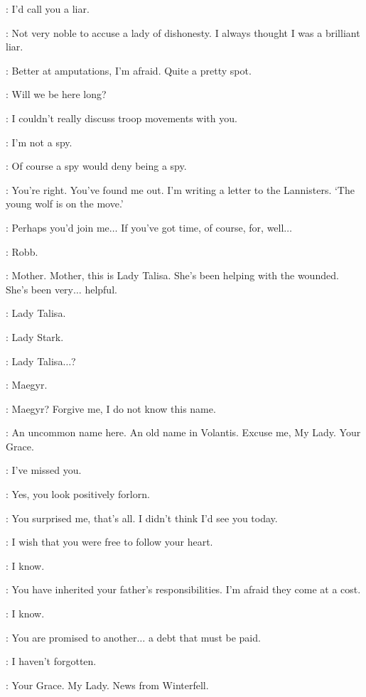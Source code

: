 \ROBB: I'd call you a liar. 

\TALISA: Not very noble to accuse a lady of dishonesty. I always thought I was a brilliant liar. 

\ROBB: Better at amputations, I'm afraid. Quite a pretty spot. 

\TALISA: Will we be here long? 

\ROBB: I couldn't really discuss troop movements with you. 

\TALISA: I'm not a spy. 

\ROBB: Of course a spy would deny being a spy. 

\TALISA: You're right. You've found me out. I'm writing a letter to the Lannisters. `The young wolf is on the move.' 

\ROBB: Perhaps you'd join me$\ldots$ If you've got time, of course, for, well$\ldots$ 


\CATELYN: Robb. 

\ROBB: Mother. Mother, this is Lady Talisa. She's been helping with the wounded. She's been very$\ldots$ helpful. 

\CATELYN: Lady Talisa. 

\TALISA: Lady Stark. 

\CATELYN: Lady Talisa$\ldots$? 

\TALISA: Maegyr. 

\CATELYN: Maegyr? Forgive me, I do not know this name. 

\TALISA: An uncommon name here. An old name in Volantis. Excuse me, My Lady. Your Grace. 

\ROBB: I've missed you. 

\CATELYN: Yes, you look positively forlorn. 

\ROBB: You surprised me, that's all. I didn't think I'd see you today. 

\CATELYN: I wish that you were free to follow your heart. 

\ROBB: I know. 

\CATELYN: You have inherited your father's responsibilities. I'm afraid they come at a cost. 

\ROBB: I know. 

\CATELYN: You are promised to another$\ldots$ a debt that must be paid. 

\ROBB: I haven't forgotten. 


\ROOSE: Your Grace. My Lady. News from Winterfell. 


